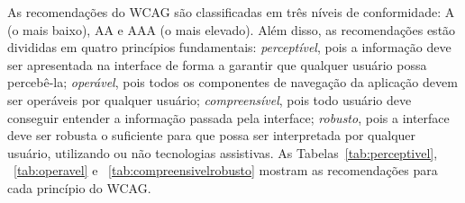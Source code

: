 As recomendações do WCAG são classificadas em três níveis de conformidade: A (o mais baixo), AA e AAA (o mais elevado). Além disso, as recomendações estão divididas em quatro princípios fundamentais: \emph{perceptível}, pois a informação deve ser apresentada na interface de forma a garantir que qualquer usuário possa percebê-la;
\emph{operável}, pois todos os componentes de navegação da aplicação devem ser operáveis por qualquer usuário;
\emph{compreensível}, pois todo usuário deve conseguir entender a informação passada pela interface;
\emph{robusto}, pois a interface deve ser robusta o suficiente para que possa ser interpretada por qualquer usuário, utilizando ou não tecnologias assistivas.
As Tabelas~\ref{tab:perceptivel}, ~\ref{tab:operavel} e ~\ref{tab:compreensivelrobusto}  mostram as recomendações para cada princípio do WCAG.

